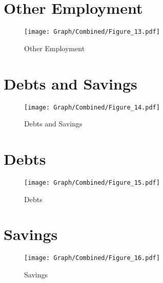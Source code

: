 \documentclass[10pt,a4paper]{article}
\begin{document}
\section{Other Employment}
\begin{table}[H]\centering

\end{table}
\begin{figure}[H]\centering
\texttt{[image: Graph/Combined/Figure\_13.pdf]}
\caption{Other Employment} \label{fig:Fig_13}
\end{figure}
\begin{table}[H]\centering

\end{table}
\pagebreak
\section{Debts and Savings}
\begin{table}[H]\centering

\end{table}
\begin{figure}[H]\centering
\texttt{[image: Graph/Combined/Figure\_14.pdf]}
\caption{Debts and Savings} \label{fig:Fig_14}
\end{figure}
\begin{table}[H]\centering

\end{table}
\pagebreak
\section{Debts}
\begin{table}[H]\centering

\end{table}
\begin{figure}[H]\centering
\texttt{[image: Graph/Combined/Figure\_15.pdf]}
\caption{Debts} \label{fig:Fig_15}
\end{figure}
\begin{table}[H]\centering

\end{table}
\pagebreak
\section{Savings}
\begin{table}[H]\centering

\end{table}
\begin{figure}[H]\centering
\texttt{[image: Graph/Combined/Figure\_16.pdf]}
\caption{Savings} \label{fig:Fig_16}
\end{figure}
\begin{table}[H]\centering

\end{table}
\pagebreak
\end{document}
